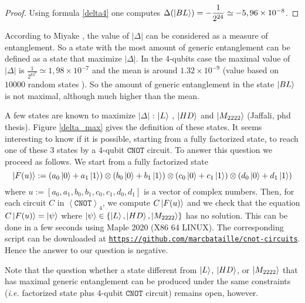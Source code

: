 \documentclass[a4paper,12pt,fleqn]{article}
\newcommand\cnot{\mathtt{CNOT}}
\newcommand\XG[1][n]{\left<\cnot\right>_{#1}}
\begin{document}
  \begin{proof}
Using formula \eqref{delta4} one computes $\Delta(\ket{BL})=-\dfrac{1}{2^{24}}\simeq -5,96\times 10^{-8}$.
    \end{proof}
    According to Miyake \cite{2002MW}, the value of $|\Delta|$ can be considered as a measure of entanglement. So a state with the most amount
of generic entanglement can be defined as a state that maximize $|\Delta|$. 
    In the 4-qubits case the maximal value of $|\Delta|$ is $\frac{1}{2^83^9}\simeq 1,98\times 10^{-7}$ \cite{2013CD} and the mean is around $1.32\times10^{-9}$ (value based on $10000$ random states \cite{2017Alsina}).
    So the amount of generic entanglement in the state $\ket{BL}$ is not maximal, although much higher than the mean.
    
    A few states are known to maximize $|\Delta|$ : $\ket{L}$
    \cite{2000HS,2012GW,2013CD}, $\ket{HD}$ \cite{2017Alsina} and   $\ket{M_{2222}}$ (Jaffali, phd thesis).
    Figure \ref{delta_max} gives the definition of these states. It seems interesting to know if it is possible, starting from a fully factorized state, to reach one of these 3 states by a 4-qubit $\cnot$ circuit. To answer this question we proceed as follows. We start from a fully factorized state
\begin{equation}
  \ket{F(u)}:=(a_0\ket{0}+a_1\ket{1})\otimes(b_0\ket{0}+b_1\ket{1})\otimes(c_0\ket{0}+c_1\ket{1})\otimes(d_0\ket{0}+d_1\ket{1})
\end{equation}
where $u:=[a_0,a_1,b_0,b_1,c_0,c_1,d_0,d_1]$ is a vector of  complex numbers. Then, for each circuit $C$ in $\XG[4]$, we compute $C\ket{F(u)}$ and we check that the equation
$C\ket{F(u)}=\ket{\psi}$ where $\ket{\psi}\in\{ \ket{L},\ket{HD},\ket{M_{2222}}\}$ has no solution. This can be done in a few seconds using Maple 2020 (X86 64 LINUX). The corresponding script can be downloaded at
\href{https://github.com/marcbataille/cnot-circuits/blob/master/entanglement/search_state.mpl}{\texttt{https://github.com/marcbataille/cnot-circuits}}. Hence the answer to our question is negative.

   Note that the question whether a state different from $\ket{L}$, $\ket{HD}$, or $\ket{M_{2222}}$ that has maximal generic entanglement can be produced under the same constraints
    (\textit{i.e.} factorized state plus 4-qubit $\cnot$ circuit) remains open, however. 
\end{document}
